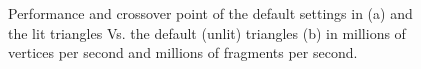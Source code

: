 \begin{figure}[!tbh]
 \centering  
  \caption{Performance and crossover point of the default settings in \protect{\wes} (a) and the lit triangles Vs. the default (unlit) triangles (b) in millions of vertices per second and millions of fragments per second.}
   \label{fig:fill_geo1}
\end{figure} 

